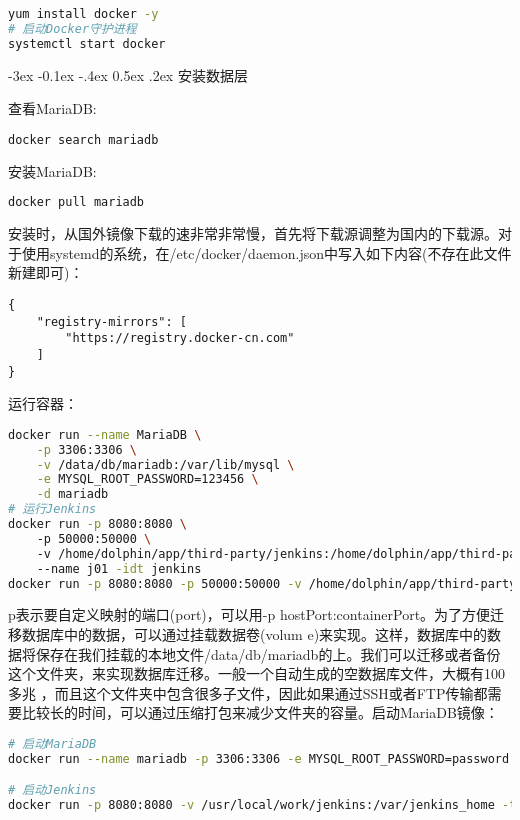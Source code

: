 \documentclass[8pt]{book}
\makeatletter
\numberwithin{dummy}{section}
\theoremstyle{ocrenumbox}
\theoremstyle{blacknumex}
\theoremstyle{blacknumbox}
\theoremstyle{ocrenum}
\renewcommand{\subsection}{\@startsection {subsection}{2}{\z@}
	{-3ex \@plus -0.1ex \@minus -.4ex}
	{0.5ex \@plus.2ex }
	{\normalfont\sffamily\bfseries}}
\makeatother
\begin{document}
\begin{lstlisting}[language=Bash]
yum install docker -y
# 启动Docker守护进程
systemctl start docker
\end{lstlisting}


\subsection{安装数据层}

查看MariaDB:

\begin{lstlisting}[language=Bash]
docker search mariadb
\end{lstlisting}

安装MariaDB:

\begin{lstlisting}[language=Bash]
docker pull mariadb
\end{lstlisting}

安装时，从国外镜像下载的速非常非常慢，首先将下载源调整为国内的下载源。对于使用systemd的系统，在/etc/docker/daemon.json中写入如下内容(不存在此文件新建即可)：

\begin{lstlisting}
{
	"registry-mirrors": [
		"https://registry.docker-cn.com"
	]
}
\end{lstlisting}

运行容器：

\begin{lstlisting}[language=Bash]
docker run --name MariaDB \
	-p 3306:3306 \
	-v /data/db/mariadb:/var/lib/mysql \
	-e MYSQL_ROOT_PASSWORD=123456 \
	-d mariadb
# 运行Jenkins
docker run -p 8080:8080 \ 
	-p 50000:50000 \ 
	-v /home/dolphin/app/third-party/jenkins:/home/dolphin/app/third-party/jenkins/jenkins_home \ 
	--name j01 -idt jenkins
docker run -p 8080:8080 -p 50000:50000 -v /home/dolphin/app/third-party/jenkins:/home/dolphin/app/third-party/jenkins/jenkins_home jenkins
\end{lstlisting}

p表示要自定义映射的端口(port)，可以用-p hostPort:containerPort。为了方便迁移数据库中的数据，可以通过挂载数据卷(volum	e)来实现。这样，数据库中的数据将保存在我们挂载的本地文件/data/db/mariadb的上。我们可以迁移或者备份这个文件夹，来实现数据库迁移。一般一个自动生成的空数据库文件，大概有100多兆 ，而且这个文件夹中包含很多子文件，因此如果通过SSH或者FTP传输都需要比较长的时间，可以通过压缩打包来减少文件夹的容量。启动MariaDB镜像：

\begin{lstlisting}[language=Bash]
# 启动MariaDB
docker run --name mariadb -p 3306:3306 -e MYSQL_ROOT_PASSWORD=password -d mariadb

# 启动Jenkins
docker run -p 8080:8080 -v /usr/local/work/jenkins:/var/jenkins_home -t jenkins
\end{lstlisting}
\end{document}
